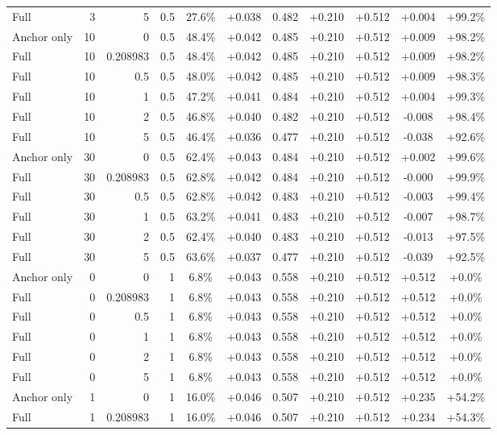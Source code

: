 \begin{table}[htbp]
\begin{tabular}{lrrrccccccc}
Full & 3 & 5 & 0.5 & 27.6\% & +0.038 & 0.482 & +0.210 & +0.512 & +0.004 & +99.2\% \\
Anchor only & 10 & 0 & 0.5 & 48.4\% & +0.042 & 0.485 & +0.210 & +0.512 & +0.009 & +98.2\% \\
Full & 10 & 0.208983 & 0.5 & 48.4\% & +0.042 & 0.485 & +0.210 & +0.512 & +0.009 & +98.2\% \\
Full & 10 & 0.5 & 0.5 & 48.0\% & +0.042 & 0.485 & +0.210 & +0.512 & +0.009 & +98.3\% \\
Full & 10 & 1 & 0.5 & 47.2\% & +0.041 & 0.484 & +0.210 & +0.512 & +0.004 & +99.3\% \\
Full & 10 & 2 & 0.5 & 46.8\% & +0.040 & 0.482 & +0.210 & +0.512 & -0.008 & +98.4\% \\
Full & 10 & 5 & 0.5 & 46.4\% & +0.036 & 0.477 & +0.210 & +0.512 & -0.038 & +92.6\% \\
Anchor only & 30 & 0 & 0.5 & 62.4\% & +0.043 & 0.484 & +0.210 & +0.512 & +0.002 & +99.6\% \\
Full & 30 & 0.208983 & 0.5 & 62.8\% & +0.042 & 0.484 & +0.210 & +0.512 & -0.000 & +99.9\% \\
Full & 30 & 0.5 & 0.5 & 62.8\% & +0.042 & 0.483 & +0.210 & +0.512 & -0.003 & +99.4\% \\
Full & 30 & 1 & 0.5 & 63.2\% & +0.041 & 0.483 & +0.210 & +0.512 & -0.007 & +98.7\% \\
Full & 30 & 2 & 0.5 & 62.4\% & +0.040 & 0.483 & +0.210 & +0.512 & -0.013 & +97.5\% \\
Full & 30 & 5 & 0.5 & 63.6\% & +0.037 & 0.477 & +0.210 & +0.512 & -0.039 & +92.5\% \\
Anchor only & 0 & 0 & 1 & 6.8\% & +0.043 & 0.558 & +0.210 & +0.512 & +0.512 & +0.0\% \\
Full & 0 & 0.208983 & 1 & 6.8\% & +0.043 & 0.558 & +0.210 & +0.512 & +0.512 & +0.0\% \\
Full & 0 & 0.5 & 1 & 6.8\% & +0.043 & 0.558 & +0.210 & +0.512 & +0.512 & +0.0\% \\
Full & 0 & 1 & 1 & 6.8\% & +0.043 & 0.558 & +0.210 & +0.512 & +0.512 & +0.0\% \\
Full & 0 & 2 & 1 & 6.8\% & +0.043 & 0.558 & +0.210 & +0.512 & +0.512 & +0.0\% \\
Full & 0 & 5 & 1 & 6.8\% & +0.043 & 0.558 & +0.210 & +0.512 & +0.512 & +0.0\% \\
Anchor only & 1 & 0 & 1 & 16.0\% & +0.046 & 0.507 & +0.210 & +0.512 & +0.235 & +54.2\% \\
Full & 1 & 0.208983 & 1 & 16.0\% & +0.046 & 0.507 & +0.210 & +0.512 & +0.234 & +54.3\% \\

\end{tabular}
\end{table}
